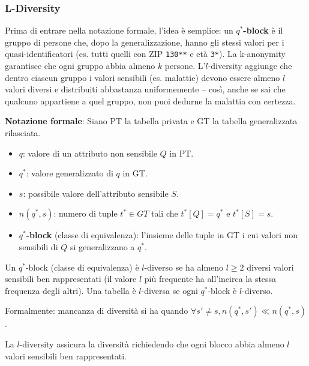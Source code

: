 \documentclass[a4paper,11pt]{article}
\begin{document}
\subsubsection{L-Diversity}

\begin{nota}
Prima di entrare nella notazione formale, l'idea è semplice: un \textbf{$q^*$-block} è il gruppo di persone che, dopo la generalizzazione, hanno gli stessi valori per i quasi-identificatori (es. tutti quelli con ZIP \texttt{130**} e età \texttt{3*}). La k-anonymity garantisce che ogni gruppo abbia almeno $k$ persone. L'$l$-diversity aggiunge che dentro ciascun gruppo i valori sensibili (es. malattie) devono essere almeno $l$ valori diversi e distribuiti abbastanza uniformemente -- così, anche se sai che qualcuno appartiene a quel gruppo, non puoi dedurne la malattia con certezza.
\end{nota}

\textbf{Notazione formale}: Siano PT la tabella privata e GT la tabella generalizzata rilasciata.
\begin{itemize}
  \item $q$: valore di un attributo non sensibile $Q$ in PT.
  \item $q^*$: valore generalizzato di $q$ in GT.
  \item $s$: possibile valore dell'attributo sensibile $S$.
  \item $n(q^*, s)$: numero di tuple $t^* \in GT$ tali che $t^*[Q]=q^*$ e $t^*[S]=s$.
  \item \textbf{$q^*$-block} (classe di equivalenza): l'insieme delle tuple in GT i cui valori non sensibili di $Q$ si generalizzano a $q^*$.
\end{itemize}

\begin{definizione}
Un $q^*$-block (classe di equivalenza) \`{e} $l$-diverso se ha almeno $l \geq 2$ diversi valori sensibili ben rappresentati (il valore $l$ pi\`{u} frequente ha all'incirca la stessa frequenza degli altri). Una tabella \`{e} $l$-diversa se ogni $q^*$-block \`{e} $l$-diverso.

Formalmente: mancanza di diversit\`{a} si ha quando $\forall s' \neq s, n(q^*, s') \ll n(q^*, s)$.

La $l$-diversity assicura la diversit\`{a} richiedendo che ogni blocco abbia almeno $l$ valori sensibili ben rappresentati.
\end{definizione}
\end{document}
